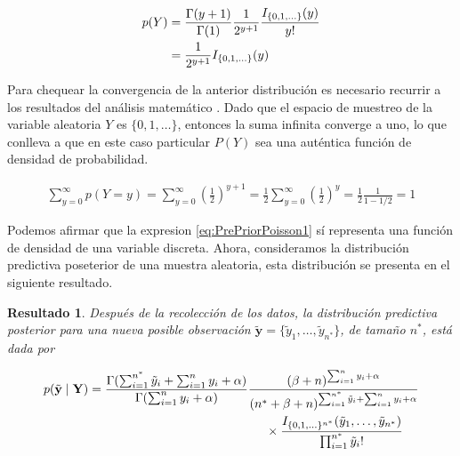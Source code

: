 \documentclass[
  10pt,
  spanish,
]{book}
\newtheorem{proposition}{Resultado}[chapter]
\theoremstyle{definition}
\theoremstyle{definition}
\theoremstyle{definition}
\theoremstyle{definition}
\theoremstyle{remark}
\begin{document}
\begin{align}
\label{eq:PrePriorPoisson1}
p(Y)&=\frac{\Gamma(y+1)}{\Gamma(1)}\frac{1}{2^{y+1}}\frac{I_{\{0,1,\ldots\}}(y)}{y!} \notag\\
&=\frac{1}{2^{y+1}}I_{\{0,1,\ldots\}}(y)
\end{align}

Para chequear la convergencia de la anterior distribución es necesario recurrir a los resultados del análisis matemático \citet[pág. 361]{Apostol}. Dado que el espacio de muestreo de la variable aleatoria \(Y\) es \(\{0,1,\ldots\}\), entonces la suma infinita converge a uno, lo que conlleva a que en este caso particular \(P(Y)\) sea una auténtica función de densidad de probabilidad.

\begin{align*}
\sum_{y=0}^{\infty}p(Y=y)=\sum_{y=0}^{\infty}\left(\frac{1}{2}\right)^{y+1}=\frac{1}{2}\sum_{y=0}^{\infty}\left(\frac{1}{2}\right)^{y}
=\frac{1}{2}\frac{1}{1-1/2}=1
\end{align*}

Podemos afirmar que la expresion \eqref{eq:PrePriorPoisson1} sí representa una función de densidad de una variable discreta. Ahora, consideramos la distribución predictiva poseterior de una muestra aleatoria, esta distribución se presenta en el siguiente resultado.

\begin{proposition}
\protect\hypertarget{prp:ResPoissonPred}{}{\label{prp:ResPoissonPred} }Después de la recolección de los datos, la distribución predictiva posterior para una nueva posible observación \(\tilde{\mathbf{y}}=\{\tilde{y}_1,\ldots,\tilde{y}_{n^*}\}\), de tamaño \(n^*\), está dada por

\begin{align}
p(\tilde{\mathbf{y}} \mid \mathbf{Y})&=\frac{\Gamma(\sum_{i=1}^{n^*}\tilde{y}_i+\sum_{i=1}^ny_i+\alpha)}{\Gamma(\sum_{i=1}^ny_i+\alpha)}
\frac{(\beta+n)^{\sum_{i=1}^ny_i+\alpha}}{({n^*}+\beta+n)^{\sum_{i=1}^{n^*}\tilde{y}_i+\sum_{i=1}^ny_i+\alpha}}\notag\\
&\hspace{5cm}\times
\frac{I_{\{0,1,\ldots\}^{n^*}}(\tilde{y}_1,\ldots,\tilde{y}_{n^*})}{\prod_{i=1}^{n^*}\tilde{y}_i!}
\end{align}
\end{proposition}
\end{document}
